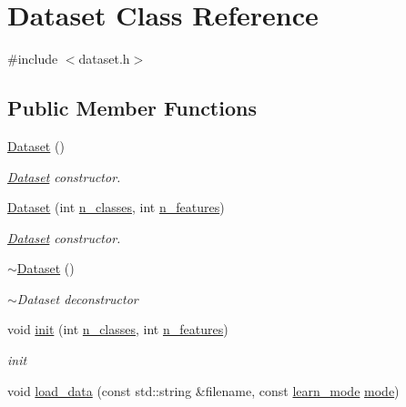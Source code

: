 \hypertarget{class_dataset}{\section{Dataset Class Reference}
\label{class_dataset}
}


{\ttfamily \#include $<$dataset.\+h$>$}

\subsection*{Public Member Functions}
\begin{DoxyCompactItemize}
\item 
\hyperlink{class_dataset_a2ef0a4a688a218d55ef061c6df659a4a}{Dataset} ()
\begin{DoxyCompactList}\small\item\em \hyperlink{class_dataset}{Dataset} constructor. \end{DoxyCompactList}\item 
\hyperlink{class_dataset_a27f84d09cd4636b95d99bb8d987da53b}{Dataset} (int \hyperlink{class_dataset_aa268a4a62f97e8351751dbd6c1ad7b8c}{n\+\_\+classes}, int \hyperlink{class_dataset_acc4ccee0cbdb6866a0063e11f0fcc591}{n\+\_\+features})
\begin{DoxyCompactList}\small\item\em \hyperlink{class_dataset}{Dataset} constructor. \end{DoxyCompactList}\item 
\hyperlink{class_dataset_a7f38b79ccbf9ada90d68d3a50250b193}{$\sim$\+Dataset} ()
\begin{DoxyCompactList}\small\item\em $\sim$\+Dataset deconstructor \end{DoxyCompactList}\item 
void \hyperlink{class_dataset_ad6cbe13045c7cc5c5b54905ce359ea21}{init} (int \hyperlink{class_dataset_aa268a4a62f97e8351751dbd6c1ad7b8c}{n\+\_\+classes}, int \hyperlink{class_dataset_acc4ccee0cbdb6866a0063e11f0fcc591}{n\+\_\+features})
\begin{DoxyCompactList}\small\item\em init \end{DoxyCompactList}\item 
void \hyperlink{class_dataset_a0346757c6fef588ad2c4e7e10fd1475d}{load\+\_\+data} (const std\+::string \&filename, const \hyperlink{dataset_8h_a87dfee910993320c6720931fb701cc41}{learn\+\_\+mode} \hyperlink{class_dataset_a9a60113e22732aedd655331884d3ff8e}{mode})

\end{DoxyCompactItemize}
